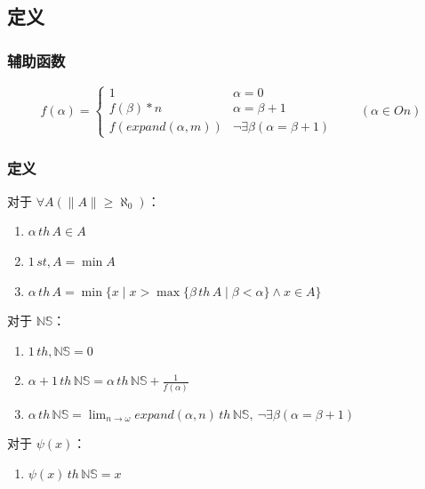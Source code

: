 \documentclass[UTF8]{ctexart}
\begin{document}
\subsection{定义}
\subsubsection{辅助函数}
\[
f(\alpha)=\begin{cases}
  1 & \alpha=0\\
  f(\beta)*n & \alpha=\beta+1\\
  f(expand(\alpha,m)) & \lnot\exists\beta(\alpha=\beta+1)
\end{cases}\qquad(\alpha\in On)
\]

\subsubsection{定义}
对于 $\forall A(\|A\|\ge\aleph_0)$：
\begin{enumerate}
  \item $\alpha\,th\,A\in A$
  \item $1\,st,A=\min A$
  \item $\alpha\,th\,A=\min\{x\mid x>\max\{\beta\,th\,A\mid\beta<\alpha\}\land x\in A\}$
\end{enumerate}
对于 $\mathbb{NS}$：
\begin{enumerate}
  \item $1\,th,\mathbb{NS}=0$
  \item $\alpha+1\,th\,\mathbb{NS}=\alpha\,th\,\mathbb{NS}+\frac{1}{f(\alpha)}$
  \item $\alpha\,th\,\mathbb{NS}=\lim_{n\to\omega}expand(\alpha,n)\,th\,\mathbb{NS},\ \lnot\exists\beta(\alpha=\beta+1)$
\end{enumerate}
对于 $\psi(x)$：
\begin{enumerate}
  \item $\psi(x)\,th\,\mathbb{NS}=x$
\end{enumerate}
\end{document}
